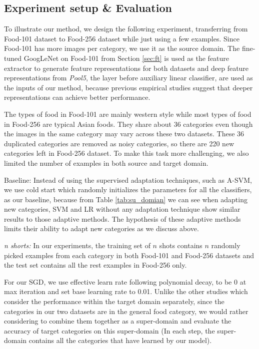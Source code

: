 \subsection{Experiment setup \& Evaluation}
To illustrate our method, we design the following experiment, transferring from Food-101 dataset to Food-256 dataset while just using a few examples. Since Food-101 has more images per category, we use it as the source domain. The fine-tuned GoogLeNet on Food-101 from Section \ref{sec:ft} is used as the feature extractor to generate feature representations for both datasets and deep feature representations from \emph{Pool5}, the layer before auxiliary linear classifier, are used as the inputs of our method, because previous empirical studies suggest that deeper representations can achieve better performance\cite{hoffman2013one}.

The types of food in Food-101 are mainly western style while most types of food in Food-256 are typical Asian foods. They share about 36 categories even though the images in the same category may vary across these two datasets. These 36 duplicated categories are removed as noisy categories, so there are 220 new categories left in Food-256 dataset.
To make this task more challenging, we also limited the number of examples in both source and target domain.

Baseline: Instead of using the supervised adaptation techniques, such as A-SVM, we use cold start which randomly initializes the parameters for all the classifiers, as our baseline, because from Table \ref{tab:su_domian} we can see when adapting new categories, SVM and LR without any adaptation technique show similar results to those adaptive methods. The hypothesis of these adaptive methods limits their ability to adapt new categories as we discuss above.

\emph{n shorts:} In our experiments, the training set of $n$ shots contains $n$ randomly picked examples from each category in both Food-101 and Food-256 datasets and the test set contains all the rest examples in Food-256 only.

For our SGD, we use effective learn rate following polynomial decay, to be 0 at max iteration and set base learning rate to 0.01. Unlike the other studies which consider the performance within the target domain separately, since the categories in our two datasets are in the general food category, we would rather considering to combine them together as a super-domain and evaluate the accuracy of target categories on this super-domain (In each step, the super-domain contains all the categories that have learned by our model).
